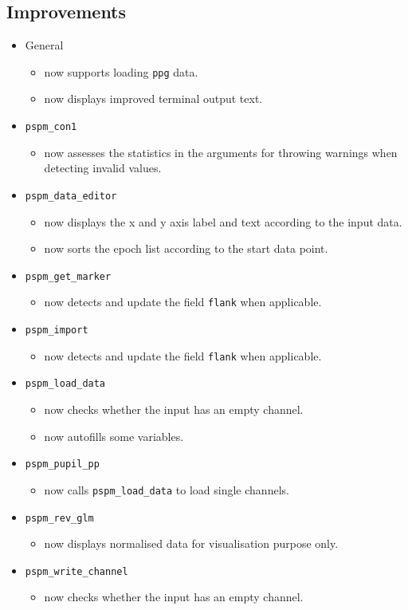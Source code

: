 \documentclass[english]{article}
\numberwithin{equation}{section}
\numberwithin{figure}{section}
\begin{document}
\subsection*{Improvements}
\begin{itemize}
\item General
  \begin{itemize}
  \item now supports loading \texttt{ppg} data.
  \item now displays improved terminal output text.
  \end{itemize}
\item \texttt{pspm\_con1}
  \begin{itemize}
  \item now assesses the statistics in the arguments for throwing warnings when detecting invalid values.
  \end{itemize}
\item \texttt{pspm\_data\_editor}
  \begin{itemize}
  \item now displays the x and y axis label and text according to the input data.
  \item now sorts the epoch list according to the start data point.
  \end{itemize}
\item \texttt{pspm\_get\_marker}
  \begin{itemize}
  \item now detects and update the field \texttt{flank} when applicable.
  \end{itemize}
\item \texttt{pspm\_import}
  \begin{itemize}
  \item now detects and update the field \texttt{flank} when applicable.
  \end{itemize}
\item \texttt{pspm\_load\_data}
  \begin{itemize}
  \item now checks whether the input has an empty channel.
  \item now autofills some variables.
  \end{itemize}
\item \texttt{pspm\_pupil\_pp}
  \begin{itemize}
  \item now calls \texttt{pspm\_load\_data} to load single channels.
  \end{itemize}
\item \texttt{pspm\_rev\_glm}
  \begin{itemize}
  \item now displays normalised data for visualisation purpose only.
  \end{itemize}
\item \texttt{pspm\_write\_channel}
  \begin{itemize}
  \item now checks whether the input has an empty channel.
  \end{itemize}
\end{itemize}
\end{document}
